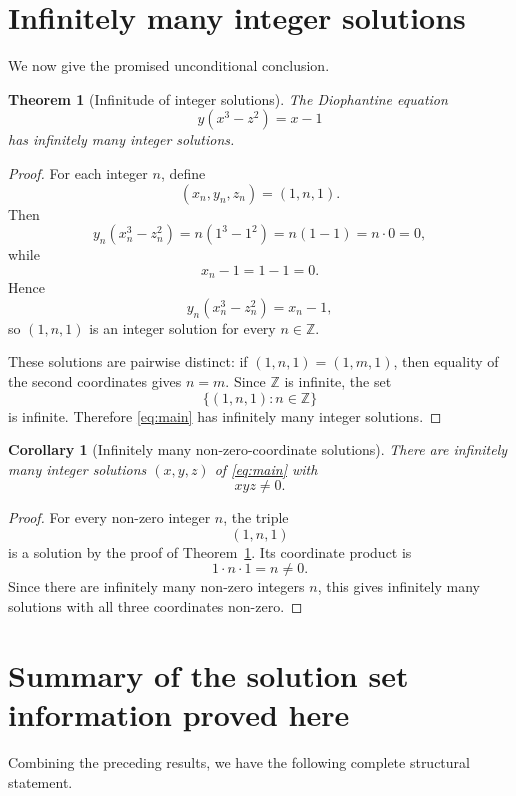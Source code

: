 \documentclass[11pt]{article}
\newtheorem{theorem}{Theorem}
\newtheorem{corollary}{Corollary}
\begin{document}
\section{Infinitely many integer solutions}

We now give the promised unconditional conclusion.

\begin{theorem}[Infinitude of integer solutions]\label{thm:infinitely-many}
The Diophantine equation
\[
    y(x^3-z^2)=x-1
\]
has infinitely many integer solutions.
\end{theorem}

\begin{proof}
For each integer \(n\), define
\[
    (x_n,y_n,z_n)=(1,n,1).
\]
Then
\[
    y_n(x_n^3-z_n^2)
    =n(1^3-1^2)
    =n(1-1)
    =n\cdot 0
    =0,
\]
while
\[
    x_n-1=1-1=0.
\]
Hence
\[
    y_n(x_n^3-z_n^2)=x_n-1,
\]
so \((1,n,1)\) is an integer solution for every \(n\in\mathbb Z\).

These solutions are pairwise distinct: if \((1,n,1)=(1,m,1)\), then equality of the second coordinates gives \(n=m\).  Since \(\mathbb Z\) is infinite, the set
\[
    \{(1,n,1):n\in\mathbb Z\}
\]
is infinite.  Therefore \eqref{eq:main} has infinitely many integer solutions.
\end{proof}

\begin{corollary}[Infinitely many non-zero-coordinate solutions]\label{cor:nonzero}
There are infinitely many integer solutions \((x,y,z)\) of \eqref{eq:main} with
\[
    xyz\ne 0.
\]
\end{corollary}

\begin{proof}
For every non-zero integer \(n\), the triple
\[
    (1,n,1)
\]
is a solution by the proof of Theorem~\ref{thm:infinitely-many}.  Its coordinate product is
\[
    1\cdot n\cdot 1=n\ne 0.
\]
Since there are infinitely many non-zero integers \(n\), this gives infinitely many solutions with all three coordinates non-zero.
\end{proof}

\section{Summary of the solution set information proved here}

Combining the preceding results, we have the following complete structural statement.
\end{document}
